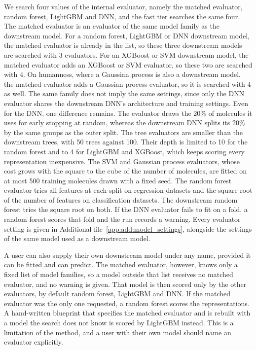 We search four values of the internal evaluator, namely the matched evaluator, random forest, LightGBM and DNN, and the fast tier searches the same four. The matched evaluator is an evaluator of the same model family as the downstream model. For a random forest, LightGBM or DNN downstream model, the matched evaluator is already in the list, so these three downstream models are searched with 3 evaluators. For an XGBoost or SVM downstream model, the matched evaluator adds an XGBoost or SVM evaluator, so these two are searched with 4. On humanness, where a Gaussian process is also a downstream model, the matched evaluator adds a Gaussian process evaluator, so it is searched with 4 as well. The same family does not imply the same settings, since only the DNN evaluator shares the downstream DNN's architecture and training settings. Even for the DNN, one difference remains. The evaluator draws the 20\% of molecules it uses for early stopping at random, whereas the downstream DNN splits its 20\% by the same groups as the outer split. The tree evaluators are smaller than the downstream trees, with 50 trees against 100. Their depth is limited to 10 for the random forest and to 4 for LightGBM and XGBoost, which keeps scoring every representation inexpensive. The SVM and Gaussian process evaluators, whose cost grows with the square to the cube of the number of molecules, are fitted on at most 500 training molecules drawn with a fixed seed. The random forest evaluator tries all features at each split on regression datasets and the square root of the number of features on classification datasets. The downstream random forest tries the square root on both. If the DNN evaluator fails to fit on a fold, a random forest scores that fold and the run records a warning. Every evaluator setting is given in Additional file~\ref{app:add:model_settings}, alongside the settings of the same model used as a downstream model.

A user can also supply their own downstream model under any name, provided it can be fitted and can predict. The matched evaluator, however, knows only a fixed list of model families, so a model outside that list receives no matched evaluator, and no warning is given. That model is then scored only by the other evaluators, by default random forest, LightGBM and DNN. If the matched evaluator was the only one requested, a random forest scores the representations. A hand-written blueprint that specifies the matched evaluator and is rebuilt with a model the search does not know is scored by LightGBM instead. This is a limitation of the method, and a user with their own model should name an evaluator explicitly.

